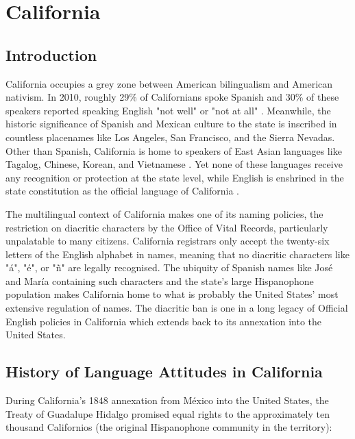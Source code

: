 \section{California}

\subsection{Introduction}

California occupies a grey zone between American bilingualism and American
nativism. In 2010, roughly 29\% of Californians spoke Spanish and 30\% of these
speakers reported speaking English "not well" or "not at all"
\parencite{acs-lang-states}. Meanwhile, the historic significance of Spanish
and Mexican culture to the state is inscribed in countless placenames like Los
Angeles, San Francisco, and the Sierra Nevadas. Other than Spanish, California
is home to speakers of East Asian languages like Tagalog, Chinese, Korean, and
Vietnamese \parencite{acs-lang-states}. Yet none of these languages receive any
recognition or protection at the state level, while English is enshrined in the
state constitution as the official language of California \parencite{ca-const}.

The multilingual context of California makes one of its naming policies, the
restriction on diacritic characters by the Office of Vital Records,
particularly unpalatable to many citizens. California registrars only accept
the twenty-six letters of the English alphabet in names, meaning that no
diacritic characters like "á", "é", or "ñ" are legally recognised. The ubiquity
of Spanish names like José and María containing such characters and the state's
large Hispanophone population makes California home to what is probably the
United States' most extensive regulation of names. The diacritic ban is one in
a long legacy of Official English policies in California which extends back to
its annexation into the United States.

\subsection{History of Language Attitudes in California}

During California's 1848 annexation from México into the United States, the
Treaty of Guadalupe Hidalgo promised equal rights to the approximately ten
thousand Californios (the original Hispanophone community in the territory):

